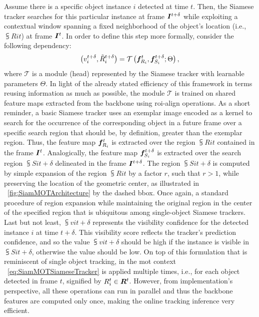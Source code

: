 Assume there is a specific object instance $i$ detected at time $t$. Then, the Siamese tracker searches for this particular instance at frame $\bm{I}^{t + \delta}$ while exploiting a contextual window spanning a fixed neighborhood of the object's location (i.e., $\subsup{R}{i}{t}$) at frame $\bm{I}^{t}$. In order to define this step more formally, consider the following dependency:
\begin{equation}
    \label{eq:SiamMOTSiameseTracker}
    \left( {
        {v}_{i}^{t + \delta},
        {\tilde{R}}_{i}^{t + \delta}
    } \right) =
    {\mathcal{T}} \left( 
        \bm{f}_{R_i}^{t}, \bm{f}_{S_i}^{t + \delta}; \Theta
     \right),
\end{equation}
where $\mathcal{T}$ is a module (head) represented by the Siamese tracker with learnable parameters $\Theta$. In light of the already stated efficiency of this framework in terms reusing information as much as possible, the module $\mathcal{T}$ is trained on shared feature maps extracted from the backbone using \gls{roi}-align operations. As a short reminder, a basic Siamese tracker uses an exemplar image encoded as a kernel to search for the occurrence of the corresponding object in a future frame over a specific search region that should be, by definition, greater than the exemplar region. Thus, the feature map $\bm{f}_{R_i}^{t}$ is extracted over the region $\subsup{R}{i}{t}$ contained in the frame $\bm{I}^{t}$. Analogically, the feature map $\bm{f}_{S_i}^{t + \delta}$ is extracted over the search region $\subsup{S}{i}{t + \delta}$ delineated in the frame $\bm{I}^{t + \delta}$. The region $\subsup{S}{i}{t + \delta}$ is computed by simple expansion of the region $\subsup{R}{i}{t}$ by a factor $r$, such that $r > 1$, while preserving the location of the geometric center, as illustrated in \figstr{}~\ref{fig:SiamMOTArchitecture} by the dashed \gls{bbox}. Once again, a standard procedure of region expansion while maintaining the original region in the center of the specified region that is ubiquitous among single-object Siamese trackers. Last but not least, $\subsup{v}{i}{t + \delta}$ represents the visibility confidence for the detected instance $i$ at time $t + \delta$. This visibility score reflects the tracker's prediction confidence, and so the value $\subsup{v}{i}{t + \delta}$ should be high if the instance is visible in $\subsup{S}{i}{t + \delta}$, otherwise the value should be low. On top of this formulation that is reminiscent of single object tracking, in the \gls{mot} context \eqstr{}~\ref{eq:SiamMOTSiameseTracker} is applied multiple times, i.e., for each object detected in frame $t$, signified by ${R}_{i}^{t} \in \bm{R}^{t}$. However, from implementation's perspective, all these operations can run in parallel and thus the backbone features are computed only once, making the online tracking inference very efficient.

